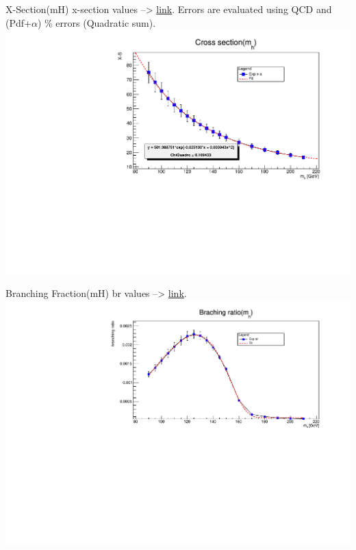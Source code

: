 \documentclass[10pt,UKenglish, leqno, xcolor = dvipsnames]{beamer}
\begin{document}
		\begin{frame}{X-Section(mH)}
			x-section values --> \href{https://twiki.cern.ch/twiki/bin/view/LHCPhysics/CERNYellowReportPageBSMAt13TeV}{link}. Errors are evaluated using QCD and (Pdf+$\alpha$) \% errors (Quadratic sum).
			\vfill
			\centering
			\includegraphics[width=.9\textwidth]{../images/x_section_fit.pdf}
			\vfill
		\end{frame}
	
		\begin{frame}{Branching Fraction(mH)}
			br values --> \href{https://arxiv.org/abs/1307.1347}{link}. 
			\vfill
			\centering
			\includegraphics[width=1.\textwidth]{../images/br_fit.pdf}
			\vfill
		\end{frame}
	
\end{document}
